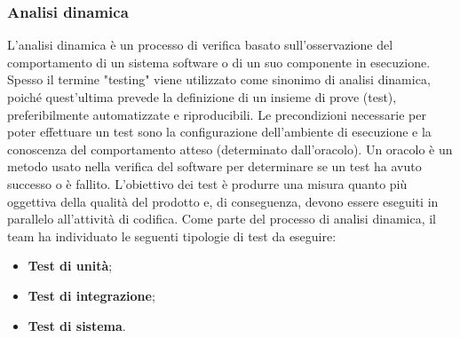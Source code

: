 \subsubsection{Analisi dinamica}
\par L’analisi dinamica è un processo di verifica basato sull’osservazione del comportamento di un sistema software o di un suo componente in esecuzione. Spesso il termine "testing" viene utilizzato come sinonimo di analisi dinamica, poiché quest’ultima prevede la definizione di un insieme di prove (test), preferibilmente automatizzate e riproducibili. Le precondizioni necessarie per poter effettuare un test sono la configurazione dell'ambiente di esecuzione e la conoscenza del comportamento atteso (determinato dall'oracolo). Un oracolo è un metodo usato nella verifica del software per determinare se un test ha avuto successo o è fallito. L’obiettivo dei test è produrre una misura quanto più oggettiva della qualità del prodotto e, di conseguenza, devono essere eseguiti in parallelo all'attività di codifica. Come parte del processo di analisi dinamica, il team ha individuato le seguenti tipologie di test da eseguire:
\begin{itemize}
  \item \textbf{Test di unità};
  \item \textbf{Test di integrazione};
  \item \textbf{Test di sistema}.
\end{itemize}


